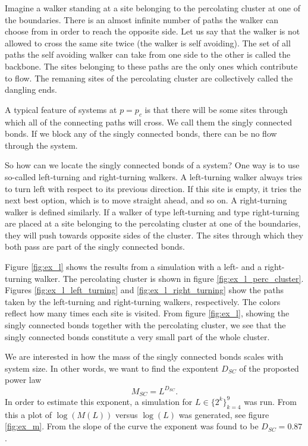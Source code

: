 \documentclass[12pt]{article}
\newcommand{\bdi}{\begin{displaymath}}
\newcommand{\edi}{\end{displaymath}}
\begin{document}
Imagine a walker standing at a site belonging to the percolating cluster at one of the boundaries. There is an almost infinite number of paths the walker can choose from in order to reach the opposite side. Let us say that
the walker is not allowed to cross the same site twice (the walker is self avoiding). The set of all paths the self avoiding walker can take from one side to the other is called the backbone. The sites
belonging to these paths are the only ones which contribute to flow. The remaning sites of the percolating cluster are collectively called the dangling ends.

A typical feature of systems at $p=p_c$ is that there will be some sites through which all of the connecting paths will cross. We call them the singly connected bonds. If we block any of the singly connected bonds,
there can be no flow through the system.

So how can we locate the singly connected bonds of a system? One way is to use so-called left-turning and right-turning walkers. A left-turning walker always tries to turn left with respect to its previous direction.
If this site is empty, it tries the next best option, which is to move straight ahead, and so on. A right-turning walker is defined similarly. If a walker of type left-turning and type right-turning are placed at a
site belonging to the percolating cluster at one of the boundaries, they will push towards opposite sides of the cluster. The sites through which they both pass are part of the singly connected bonds.

Figure \ref{fig:ex_l} shows the results from a simulation with a left- and a right-turning walker. The percolating cluster is shown in figure \ref{fig:ex_l_perc_cluster}.
Figures \ref{fig:ex_l_left_turning} and \ref{fig:ex_l_right_turning} show the paths taken by the left-turning and right-turning walkers, respectively. The colors reflect how many times each site is visited.
From figure \ref{fig:ex_l}, showing the singly connected bonds together with the percolating cluster, we see that the singly connected bonds constitute a very small part of the whole cluster.

We are interested in how the mass of the singly connected bonds scales with system size. In other words, we want to find the expontent $D_{SC}$ of the proposted power law
\bdi
M_{SC} = L^{D_{SC}}.
\edi
In order to estimate this exponent, a simulation for $L\in\{2^k\}_{k=4}^9$ was run. From this a plot of $\log(M(L))$ versus $\log(L)$ was generated, see figure \ref{fig:ex_m}. From the slope of the curve
the exponent was found to be $D_{SC} = 0.87$.
\end{document}
